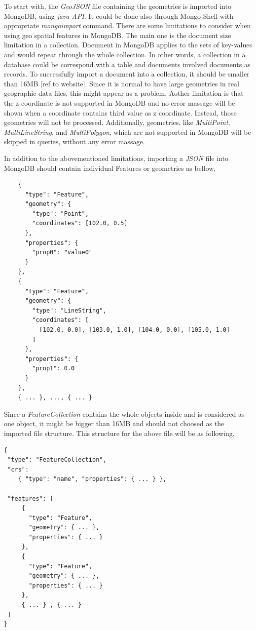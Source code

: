 \documentclass[a4paper,12pt]{article}
\begin{document}
To start with, the \textit{GeoJSON} file containing the geometries is imported into MongoDB, using \textit{java API}. It could be done also through Mongo Shell with appropriate \textit{mongoimport} command. There are some limitations to consider when using geo spatial features in MongoDB. The main one is the document size limitation in a collection. Document in MongoDB applies to the sets of key-values and would repeat through the whole collection. In other words, a collection in a database could be correspond with a table and documents involved documents as records. To successfully import a document into a collection, it  should be smaller than 16MB [ref to website]. Since it is normal to have large geometries in real geographic data files, this might appear as a problem. Aother limitation is that the z coordinate is not supported in MongoDB and no error massage will be shown when a coordinate contains third value as z coordinate. Instead, those geometries will not be processed. Additionally, geometries, like \textit{MultiPoint}, \textit{MultiLineString}, and \textit{MultiPolygon}, which are not supported in MongoDB  will be skipped in queries, without any error massage. 

In addition to the abovementioned limitations, importing a \textit{JSON} file into MongoDB should contain individual Features or geometries as bellow, 
 
\begin{verbatim}
    {
      "type": "Feature",
      "geometry": {
        "type": "Point",
        "coordinates": [102.0, 0.5]
      },
      "properties": {
        "prop0": "value0"
      }
    },
    {
      "type": "Feature",
      "geometry": {
        "type": "LineString",
        "coordinates": [
          [102.0, 0.0], [103.0, 1.0], [104.0, 0.0], [105.0, 1.0]
        ]
      },
      "properties": {
        "prop1": 0.0
      }
    }, 
    { ... }, ..., { ... }
\end{verbatim}

Since a \textit{FeatureCollection} contains the whole objects inside and is considered as one object, it might be bigger than 16MB and should not choosed as the imported file structure. This structure for the above file will be as following,
\begin{verbatim}
{
 "type": "FeatureCollection",
 "crs": 
    { "type": "name", "properties": { ... } },
                                                                                
 "features": [
     {
       "type": "Feature",
       "geometry": { ... },
       "properties": { ... }
     },
     {
       "type": "Feature",
       "geometry": { ... },
       "properties": { ... }
     }, 
     { ... } , { ... }
 ]
}
\end{verbatim}
\end{document}
